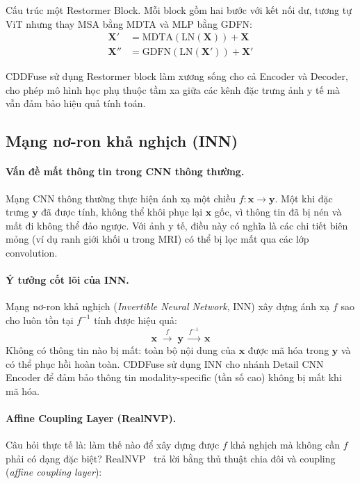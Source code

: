 Cấu trúc một Restormer Block.
Mỗi block gồm hai bước với kết nối dư, tương tự ViT nhưng thay MSA bằng MDTA và MLP bằng GDFN:
\begin{align}
\mathbf{X}' &= \mathrm{MDTA}\!\left(\mathrm{LN}(\mathbf{X})\right) + \mathbf{X} \\
\mathbf{X}'' &= \mathrm{GDFN}\!\left(\mathrm{LN}(\mathbf{X}')\right) + \mathbf{X}'
\end{align}

CDDFuse sử dụng Restormer block làm xương sống cho cả Encoder và Decoder, cho phép mô hình học phụ thuộc tầm xa giữa các kênh đặc trưng ảnh y tế mà vẫn đảm bảo hiệu quả tính toán.

\subsection{Mạng nơ-ron khả nghịch (INN)}
\label{ssec:inn}

\paragraph{Vấn đề mất thông tin trong CNN thông thường.}
Mạng CNN thông thường thực hiện ánh xạ một chiều $f: \mathbf{x} \to \mathbf{y}$. Một khi đặc trưng $\mathbf{y}$ đã được tính, không thể khôi phục lại $\mathbf{x}$ gốc, vì thông tin đã bị nén và mất đi không thể đảo ngược. Với ảnh y tế, điều này có nghĩa là các chi tiết biên mỏng (ví dụ ranh giới khối u trong MRI) có thể bị lọc mất qua các lớp convolution.

\paragraph{Ý tưởng cốt lõi của INN.}
Mạng nơ-ron khả nghịch (\emph{Invertible Neural Network}, INN) xây dựng ánh xạ $f$ sao cho luôn tồn tại $f^{-1}$ tính được hiệu quả:
\[
\mathbf{x} \;\xrightarrow{f}\; \mathbf{y} \;\xrightarrow{f^{-1}}\; \mathbf{x}
\]
Không có thông tin nào bị mất: toàn bộ nội dung của $\mathbf{x}$ được mã hóa trong $\mathbf{y}$ và có thể phục hồi hoàn toàn. CDDFuse sử dụng INN cho nhánh Detail CNN Encoder để đảm bảo thông tin modality-specific (tần số cao) không bị mất khi mã hóa.

\paragraph{Affine Coupling Layer (RealNVP).}
Câu hỏi thực tế là: làm thế nào để xây dựng được $f$ khả nghịch mà không cần $f$ phải có dạng đặc biệt? RealNVP~\cite{dinh2017density} trả lời bằng thủ thuật chia đôi và coupling (\emph{affine coupling layer}):

